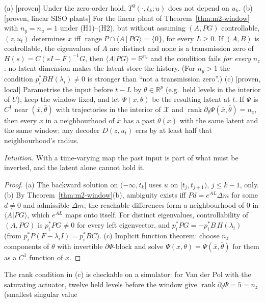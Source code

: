 \begin{proposition}\label{prop:m2-current}
(a) [proven] Under the zero-order hold, $T^0(\cdot,t_k;u)$ does not depend on $u_k$.
(b) [proven, linear SISO plants] For the linear plant of Theorem~\ref{thm:m2-window} with $n_y=n_u=1$ under (H1)--(H2), but without assuming $(A,PG)$
controllable,
$(z,u_t)$ determines $x$ iff $\operatorname{range}P\cap\langle A\,|\,PG\rangle=\{0\}$, for every $L\ge0$. If $(A,B)$
is controllable, the eigenvalues of $A$ are distinct and none is a transmission zero of $H(s)=C(sI-F)^{-1}G$, then
$\langle A|PG\rangle=\mathbb R^{n_z}$ and the condition fails \emph{for every} $n_z$: no latent dimension makes the
latent store the history. (For $n_y>1$ the condition $p_i^*BH(\lambda_i)\ne0$ is stronger than ``not a transmission
zero''.)
(c) [proven, local] Parametrise the input before $t-L$ by $\theta\in\mathbb R^p$ (e.g.\ held levels in the
interior of $U$), keep the window fixed, and let $\Psi(x,\theta)$ be the resulting latent at $t$. If $\Psi$ is
$C^1$ near $(\bar x,\bar\theta)$ with trajectories in the interior of $\mathcal X$ and
$\operatorname{rank}\partial_\theta\Psi(\bar x,\bar\theta)=n_z$, then every $x$ in a neighbourhood of $\bar x$ has a past
$\theta(x)$ with the same latent and the same window; any decoder $D(z,u_t)$ errs by at least half that
neighbourhood's radius.
\end{proposition}
\emph{Intuition.} With a time-varying map the past input is part of what must be inverted, and the latent
alone cannot hold it.
\begin{proof}
(a) The backward solution on $(-\infty,t_k]$ uses $u$ on $[t_j,t_{j+1})$, $j\le k-1$, only.
(b) By Theorem~\ref{thm:m2-window}(b), ambiguity exists iff $P d=e^{AL}\Delta m$ for some $d\ne0$ and admissible
$\Delta m$; the reachable differences form a neighbourhood of $0$ in $\langle A|PG\rangle$, which $e^{AL}$ maps onto
itself. For distinct eigenvalues, controllability of $(A,PG)$ is $p_i^*PG\ne0$ for every left eigenvector,
and $p_i^*PG=-p_i^*B\,H(\lambda_i)$ (from $p_i^*P(F-\lambda_iI)=p_i^*BC$).
(c) Implicit function theorem: choose $n_z$ components of $\theta$ with invertible $\partial\Psi$-block and solve
$\Psi(x,\theta)=\Psi(\bar x,\bar\theta)$ for them as a $C^1$ function of $x$.
\end{proof}
The rank condition in (c) is checkable on a simulator: for Van der Pol with the saturating actuator,
twelve held levels before the window give $\operatorname{rank}\partial_\theta\Psi=5=n_z$ (smallest singular value
